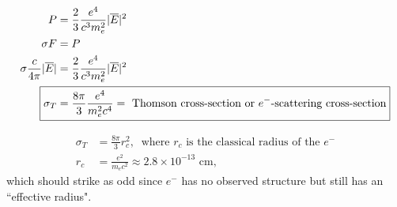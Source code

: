 \begin{align}
P &= \frac{2}{3}\frac{e^4}{c^3 m_e^2}|\overline{E}|^2\\
\sigma F &= P\\
\sigma \frac{c}{4\pi}|\overline{E}| &= \frac{2}{3}\frac{e^4}{c^3 m_e^2}|\overline{E}|^2\\
\Aboxed{\sigma_T &= \frac{8\pi}{3}\frac{e^4}{m_e^2 c^4} = \text{ Thomson cross-section or $e^-$-scattering cross-section}}
\end{align}

\begin{align}
\sigma_T &= \frac{8\pi}{3}r_c^2,~\text{ where $r_c$ is the classical radius of the $e^-$}\\
r_c &=\frac{e^2}{m_e c^2} \approx 2.8 \times 10^{-13} \text{ cm},
\end{align}
which should strike as odd since $e^-$ has no observed structure but still has an ``effective radius".